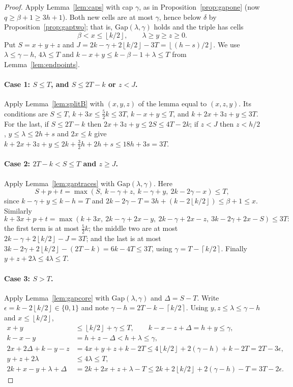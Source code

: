 \documentclass[11pt]{article}
\numberwithin{equation}{section}
\theoremstyle{definition}
\theoremstyle{remark}
\newcommand{\ceil}[1]{\left\lceil #1\right\rceil}
\newcommand{\floor}[1]{\left\lfloor #1\right\rfloor}
\newcommand{\Gap}{\mathrm{Gap}}
\begin{document}
\begin{proof}
Apply Lemma~\ref{lem:caps} with cap $\gamma$, as in
Proposition~\ref{prop:gapone} (now $q\ge\beta+1\ge3h+1$). Both new cells
are at most $\gamma$, hence below $\delta$ by
Proposition~\ref{prop:gaptwo}; that is, $\Gap(\lambda,\gamma)$ holds and
the triple has cells
\[
 \beta<x\le\floor{k/2},\qquad \lambda\ge y\ge z\ge0 .
\]
Put $S=x+y+z$ and $J=2k-\gamma+2\floor{k/2}-3T=\floor{(h-s)/2}$. We use
$\lambda\le\gamma-h$, $4\lambda\le T$ and $k-x+y\le k-\beta-1+\lambda\le T$
from Lemma~\ref{lem:endpoints}.

\paragraph{Case 1: $S\le T$, and $S\le2T-k$ or $z<J$.}
Apply Lemma~\ref{lem:splitB} with $(x,y,z)$ of the lemma equal to
$(x,z,y)$. Its conditions are $S\le T$, $k+3x\le\tfrac52k\le3T$,
$k-x+y\le T$, and $k+2x+3z+y\le3T$. For the last, if $S\le2T-k$ then
$2x+3z+y\le2S\le4T-2k$; if $z<J$ then $z<h/2$, $y\le\lambda\le2h+s$ and
$2x\le k$ give $k+2x+3z+y\le2k+\tfrac32h+2h+s\le18h+3s=3T$.

\paragraph{Case 2: $2T-k<S\le T$ and $z\ge J$.}
Apply Lemma~\ref{lem:gaptraces} with $\Gap(\lambda,\gamma)$. Here
\[
 S+p+t=\max(S,\ k-\gamma+z,\ k-\gamma+y,\ 2k-2\gamma-x)\le T,
\]
since $k-\gamma+y\le k-h=T$ and $2k-2\gamma-T=3h+(k-2\floor{k/2})\le\beta+1\le x$.
Similarly
\[
 k+3x+p+t=\max(k+3x,\ 2k-\gamma+2x-y,\ 2k-\gamma+2x-z,\ 3k-2\gamma+2x-S)\le3T:
\]
the first term is at most $\tfrac52k$; the middle two are at most
$2k-\gamma+2\floor{k/2}-J=3T$; and the last is at most
$3k-2\gamma+2\floor{k/2}-(2T-k)=6k-4T\le3T$, using
$\gamma=T-\ceil{k/2}$. Finally $y+z+2\lambda\le4\lambda\le T$.

\paragraph{Case 3: $S>T$.}
Apply Lemma~\ref{lem:gapcore} with $\Gap(\lambda,\gamma)$ and
$\Delta=S-T$. Write $\epsilon=k-2\floor{k/2}\in\{0,1\}$ and note
$\gamma-h=2T-k-\ceil{k/2}$. Using $y,z\le\lambda\le\gamma-h$ and
$x\le\floor{k/2}$,
\begin{align*}
 x+y&\le\floor{k/2}+\gamma\le T,\qquad k-x-z+\Delta=h+y\le\gamma,\\
 k-x-y&=h+z-\Delta<h+\lambda\le\gamma,\\
 2x+2\Delta+k-y-z&=4x+y+z+k-2T\le4\floor{k/2}+2(\gamma-h)+k-2T=2T-3\epsilon,\\
 y+z+2\lambda&\le4\lambda\le T,\\
 2k+x-y+\lambda+\Delta&=2k+2x+z+\lambda-T\le2k+2\floor{k/2}+2(\gamma-h)-T=3T-2\epsilon.
\end{align*}
\end{proof}
\end{document}
